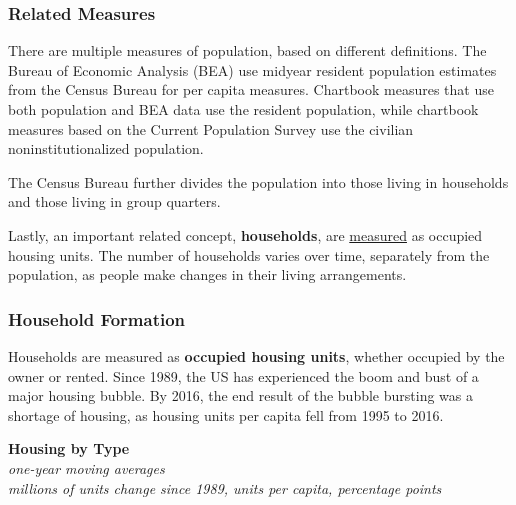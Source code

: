 \documentclass{report}
\begin{document}
{\begin{minipage}{0.76\textwidth}
\subsubsection*{Related Measures}
\small There are multiple measures of population, based on different definitions. The Bureau of Economic Analysis (BEA) use midyear resident population estimates from the Census Bureau for per capita measures. Chartbook measures that use both population and BEA data use the resident population, while chartbook measures based on the Current Population Survey use the civilian noninstitutionalized population. 

The Census Bureau further divides the population into those living in households and those living in group quarters.  

Lastly, an important related concept, \textbf{households}, are \href{https://www.census.gov/housing/hvs/index.html}{measured} as occupied housing units. The number of households varies over time, separately from the population, as people make changes in their living arrangements.  
\end{minipage}
\newpage
\begin{minipage}{0.76\textwidth}    
\subsubsection*{Household Formation}
\small Households are measured as \textbf{occupied housing units}, whether occupied by the owner or rented. Since 1989, the US has experienced the boom and bust of a major housing bubble. By 2016, the end result of the bubble bursting was a shortage of housing, as housing units per capita fell from 1995 to 2016. 
\vspace{1mm}
 
\normalsize \textbf{Housing by Type}\\
\footnotesize{\textit{one-year moving averages}}\\
\footnotesize{\textit{millions of units \hspace{3.2cm} change since 1989, units per capita, percentage points}}
\vspace*{3.9cm}


\end{minipage}}
\end{document}
